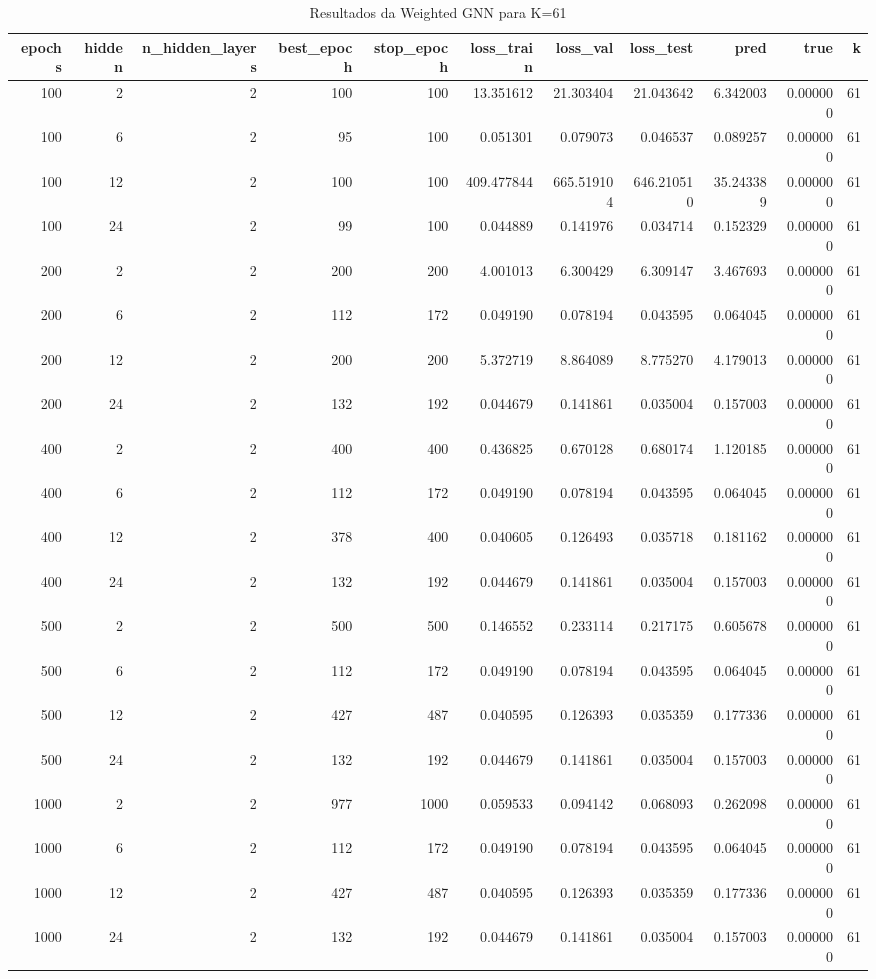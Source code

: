 \begin{table}
\caption{Resultados da Weighted GNN para K=61}
\label{tab:weighted_gnn_results_k61}
\begin{tabular}{rrrrrrrrrrr}
\toprule
epochs & hidden & n\_hidden\_layers & best\_epoch & stop\_epoch & loss\_train & loss\_val & loss\_test & pred & true & k \\
\midrule
100 & 2 & 2 & 100 & 100 & 13.351612 & 21.303404 & 21.043642 & 6.342003 & 0.000000 & 61 \\
100 & 6 & 2 & 95 & 100 & 0.051301 & 0.079073 & 0.046537 & 0.089257 & 0.000000 & 61 \\
100 & 12 & 2 & 100 & 100 & 409.477844 & 665.519104 & 646.210510 & 35.243389 & 0.000000 & 61 \\
100 & 24 & 2 & 99 & 100 & 0.044889 & 0.141976 & 0.034714 & 0.152329 & 0.000000 & 61 \\
200 & 2 & 2 & 200 & 200 & 4.001013 & 6.300429 & 6.309147 & 3.467693 & 0.000000 & 61 \\
200 & 6 & 2 & 112 & 172 & 0.049190 & 0.078194 & 0.043595 & 0.064045 & 0.000000 & 61 \\
200 & 12 & 2 & 200 & 200 & 5.372719 & 8.864089 & 8.775270 & 4.179013 & 0.000000 & 61 \\
200 & 24 & 2 & 132 & 192 & 0.044679 & 0.141861 & 0.035004 & 0.157003 & 0.000000 & 61 \\
400 & 2 & 2 & 400 & 400 & 0.436825 & 0.670128 & 0.680174 & 1.120185 & 0.000000 & 61 \\
400 & 6 & 2 & 112 & 172 & 0.049190 & 0.078194 & 0.043595 & 0.064045 & 0.000000 & 61 \\
400 & 12 & 2 & 378 & 400 & 0.040605 & 0.126493 & 0.035718 & 0.181162 & 0.000000 & 61 \\
400 & 24 & 2 & 132 & 192 & 0.044679 & 0.141861 & 0.035004 & 0.157003 & 0.000000 & 61 \\
500 & 2 & 2 & 500 & 500 & 0.146552 & 0.233114 & 0.217175 & 0.605678 & 0.000000 & 61 \\
500 & 6 & 2 & 112 & 172 & 0.049190 & 0.078194 & 0.043595 & 0.064045 & 0.000000 & 61 \\
500 & 12 & 2 & 427 & 487 & 0.040595 & 0.126393 & 0.035359 & 0.177336 & 0.000000 & 61 \\
500 & 24 & 2 & 132 & 192 & 0.044679 & 0.141861 & 0.035004 & 0.157003 & 0.000000 & 61 \\
1000 & 2 & 2 & 977 & 1000 & 0.059533 & 0.094142 & 0.068093 & 0.262098 & 0.000000 & 61 \\
1000 & 6 & 2 & 112 & 172 & 0.049190 & 0.078194 & 0.043595 & 0.064045 & 0.000000 & 61 \\
1000 & 12 & 2 & 427 & 487 & 0.040595 & 0.126393 & 0.035359 & 0.177336 & 0.000000 & 61 \\
1000 & 24 & 2 & 132 & 192 & 0.044679 & 0.141861 & 0.035004 & 0.157003 & 0.000000 & 61 \\
\bottomrule
\end{tabular}
\end{table}
